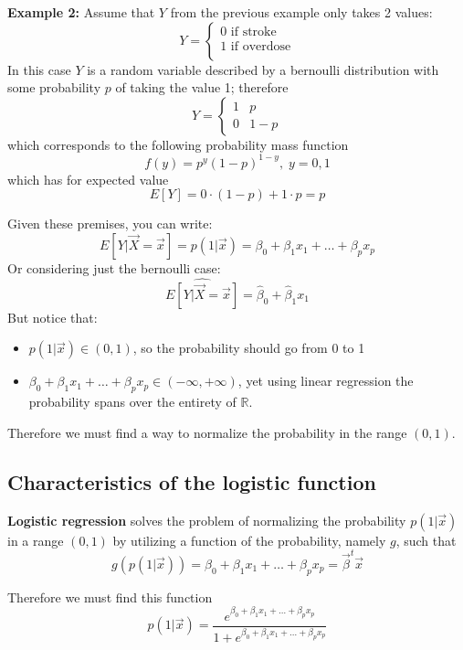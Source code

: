     \textbf{Example 2:} Assume that $Y$ from the previous example only takes 2 values:
    $$
    Y = \begin{cases}
          0 \text{ if stroke} \\
	      1 \text{ if overdose} \\
        \end{cases}
    $$
    In this case $Y$ is a random variable described by a bernoulli distribution with some probability $p$ of taking the value 1; therefore 
    $$
    Y = \begin{cases}
          1 & p \\
	      0 & 1-p
        \end{cases}
    $$
    which corresponds to the following probability mass function
    $$f(y) = p^y(1-p)^{1-y}, \; y=0,1$$
    which has for expected value
    $$E[Y] = 0 \cdot (1-p) + 1 \cdot p = p$$

    Given these premises, you can write:
    $$E[Y|\vec{X} = \vec{x}] = p(1|\vec{x}) = \beta_0 + \beta_1 x_1 + \dots + \beta_px_p$$
    Or considering just the bernoulli case:
    $$\hat{E[Y|\vec{X} = \vec{x}]} = \hat{\beta}_0 + \hat{\beta}_1x_1$$
    But notice that:
    \begin{itemize}
      \item $p(1|\vec{x}) \in (0, 1)$, so the probability should go from 0 to 1
      \item $\beta_0 + \beta_1 x_1 + \dots + \beta_px_p \in (-\infty, +\infty)$, yet using linear regression the probability spans over the entirety of $\mathbb{R}$.
    \end{itemize}
    Therefore we must find a way to normalize the probability in the range $(0,1)$.
    
    \subsection{Characteristics of the logistic function}
    \textbf{Logistic regression} solves the problem of normalizing the probability $p(1|\vec{x})$ in a range $(0,1)$ by utilizing a function of the probability, namely $g$, such that
    $$g(p(1|\vec{x})) = \beta_0 + \beta_1 x_1 + \dots + \beta_px_p = \vec{\beta}^t\vec{x}$$
    
    Therefore we must find this function 
    $$p(1|\vec{x}) = \frac{e^{\beta_0 + \beta_1 x_1 + \dots + \beta_p x_p}}
                          {1+e^{\beta_0 + \beta_1 x_1 + \dots + \beta_p x_p}}$$


